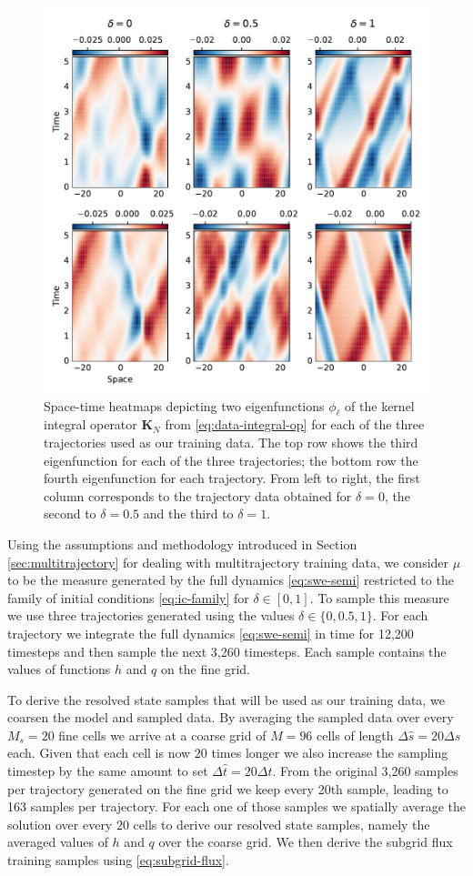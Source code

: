 \documentclass[letterpaper,10pt,3p,preprint]{elsarticle}
\newcommand{\matr}[1]{\bm{#1}}
\begin{document}
\begin{figure}[t]
    \centering
    \includegraphics[width=.7\textwidth]{vsabasis.pdf}
    \caption{Space-time heatmaps depicting two eigenfunctions
    $\phi_\ell$ of the kernel integral operator $\matr{K}_N$
    from \eqref{eq:data-integral-op}
    for each of the three trajectories used as our training data.
    The top row shows the third eigenfunction for each of the
    three trajectories; the bottom row the fourth eigenfunction
    for each trajectory.
    From left to right, the first column corresponds to the
    trajectory data obtained for $\delta=0$,
    the second to $\delta=0.5$
    and the third to $\delta=1$.}
    \label{fig:vsa-basis}
\end{figure}

Using the assumptions and methodology introduced
in Section \ref{sec:multitrajectory} for dealing
with multitrajectory training data,
we consider $\mu$ to be the measure generated by
the full dynamics \eqref{eq:swe-semi}
restricted to the family of initial conditions
\eqref{eq:ic-family} for $\delta\in [0,1]$.
To sample this measure we use three trajectories generated
using the values $\delta\in\{0,0.5,1\}$.
For each trajectory we integrate the full dynamics
\eqref{eq:swe-semi}
in time for 12,200 timesteps and then sample the next
3,260 timesteps.
Each sample contains the values of functions $h$ and $q$
on the fine grid.

To derive the resolved state samples that will be used as our
training data, we coarsen the model and sampled data.
By averaging the sampled data over every $M_s=20$ fine cells
we arrive at a coarse grid of $M=96$ cells of length
$\Delta\hat{s}=20\Delta s$ each.
Given that each cell is now $20$ times longer we also increase
the sampling timestep by the same amount to set
$\Delta\hat{t}=20\Delta t$.
From the original 3,260 samples per trajectory generated on the
fine grid we keep every 20th sample, leading to 163 samples
per trajectory.
For each one of those samples we spatially average the solution over
every $20$ cells to derive our resolved state samples,
namely the averaged values of $h$ and $q$ over the coarse grid.
We then derive the subgrid flux training samples using
\eqref{eq:subgrid-flux}.
\end{document}
